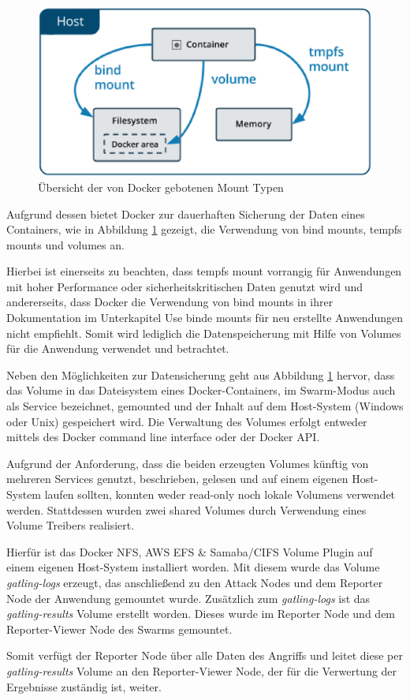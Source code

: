 \begin{figure}
	\centering
	\includegraphics[width=0.7\linewidth]{figures/DockerMounts}
	\caption[Docker Mount Typen]{Übersicht der von Docker gebotenen Mount Typen}
	\label{fig:dockermounts}
\end{figure}

Aufgrund dessen bietet Docker zur dauerhaften Sicherung der Daten eines Containers, wie in Abbildung \ref{fig:dockermounts} gezeigt, die Verwendung von bind mounts, tempfs mounts und volumes an.

Hierbei ist einerseits zu beachten, dass tempfs mount vorrangig für Anwendungen mit hoher Performance oder sicherheitskritischen Daten genutzt wird und andererseits, dass Docker die Verwendung von bind mounts in ihrer Dokumentation im Unterkapitel Use binde mounts für neu erstellte Anwendungen nicht empfiehlt. 
Somit wird lediglich die Datenspeicherung mit Hilfe von Volumes für die Anwendung verwendet und betrachtet.

Neben den Möglichkeiten zur Datensicherung geht aus Abbildung \ref{fig:dockermounts} hervor, dass das Volume in das Dateisystem eines Docker-Containers, im Swarm-Modus auch als Service bezeichnet, gemounted und der Inhalt auf dem Host-System (Windows oder Unix) gespeichert wird. 
Die Verwaltung des Volumes erfolgt entweder mittels des Docker command line interface oder der Docker API.

Aufgrund der Anforderung, dass die beiden erzeugten Volumes künftig von mehreren Services genutzt, beschrieben, gelesen und auf einem eigenen Host-System laufen sollten, konnten weder read-only noch lokale Volumens verwendet werden. 
Stattdessen wurden zwei shared Volumes durch Verwendung eines Volume Treibers realisiert.

Hierfür ist das Docker NFS, AWS EFS \& Samaba/CIFS Volume Plugin auf einem eigenen Host-System installiert worden.
Mit diesem wurde das Volume \textit{gatling-logs} erzeugt, das anschließend zu den Attack Nodes und dem Reporter Node der Anwendung gemountet wurde. 
Zusätzlich zum \textit{gatling-logs} ist das \textit{gatling-results} Volume erstellt worden. 
Dieses wurde im Reporter Node und dem Reporter-Viewer Node des Swarms gemountet.

Somit verfügt der Reporter Node über alle Daten des Angriffs und leitet diese per \textit{gatling-results} Volume an den Reporter-Viewer Node, der für die Verwertung der Ergebnisse zuständig ist, weiter.
